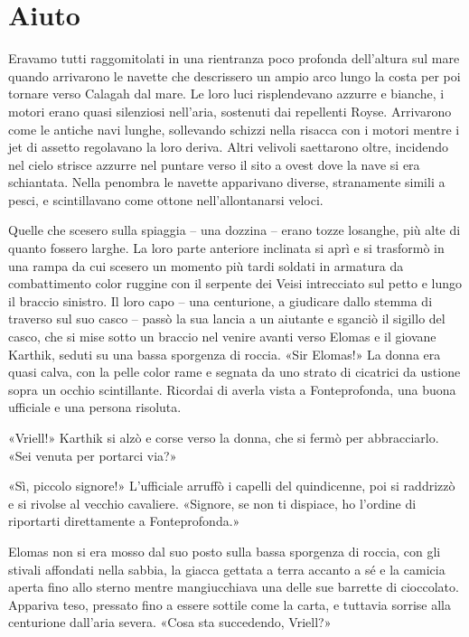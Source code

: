 \chapter{Aiuto}

Eravamo tutti raggomitolati in una rientranza poco profonda dell'altura
sul mare quando arrivarono le navette che descrissero un ampio arco
lungo la costa per poi tornare verso Calagah dal mare. Le loro luci
risplendevano azzurre e bianche, i motori erano quasi silenziosi
nell'aria, sostenuti dai repellenti Royse. Arrivarono come le antiche
navi lunghe, sollevando schizzi nella risacca con i motori mentre i jet
di assetto regolavano la loro deriva. Altri velivoli saettarono oltre,
incidendo nel cielo strisce azzurre nel puntare verso il sito a ovest
dove la nave si era schiantata. Nella penombra le navette apparivano
diverse, stranamente simili a pesci, e scintillavano come ottone
nell'allontanarsi veloci.

Quelle che scesero sulla spiaggia -- una dozzina -- erano tozze
losanghe, più alte di quanto fossero larghe. La loro parte anteriore
inclinata si aprì e si trasformò in una rampa da cui scesero un momento
più tardi soldati in armatura da combattimento color ruggine con il
serpente dei Veisi intrecciato sul petto e lungo il braccio sinistro. Il
loro capo -- una centurione, a giudicare dallo stemma di traverso sul
suo casco -- passò la sua lancia a un aiutante e sganciò il sigillo del
casco, che si mise sotto un braccio nel venire avanti verso Elomas e il
giovane Karthik, seduti su una bassa sporgenza di roccia. «Sir Elomas!»
La donna era quasi calva, con la pelle color rame e segnata da uno
strato di cicatrici da ustione sopra un occhio scintillante. Ricordai di
averla vista a Fonteprofonda, una buona ufficiale e una persona
risoluta.

«Vriell!» Karthik si alzò e corse verso la donna, che si fermò per
abbracciarlo. «Sei venuta per portarci via?»

«Sì, piccolo signore!» L'ufficiale arruffò i capelli del quindicenne,
poi si raddrizzò e si rivolse al vecchio cavaliere. «Signore, se non ti
dispiace, ho l'ordine di riportarti direttamente a Fonteprofonda.»

Elomas non si era mosso dal suo posto sulla bassa sporgenza di roccia,
con gli stivali affondati nella sabbia, la giacca gettata a terra
accanto a sé e la camicia aperta fino allo sterno mentre mangiucchiava
una delle sue barrette di cioccolato. Appariva teso, pressato fino a
essere sottile come la carta, e tuttavia sorrise alla centurione
dall'aria severa. «Cosa sta succedendo, Vriell?»

